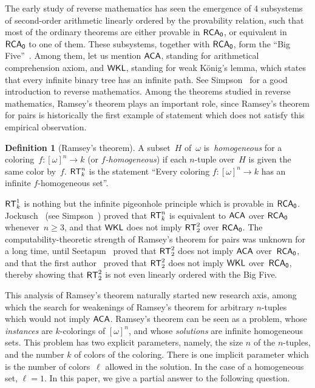 \documentclass{amsart}
\theoremstyle{definition}
\newtheorem{definition}[theorem]{Definition}
\theoremstyle{remark}
\numberwithin{equation}{section}
\theoremstyle{noparens}
\newcommand{\s}[1]{\ensuremath{\sf{#1}}}
\DeclareMathOperator{\rca}{\s{RCA}_0}
\DeclareMathOperator{\aca}{\s{ACA}}
\DeclareMathOperator{\wkl}{\s{WKL}}
\DeclareMathOperator{\rt}{\s{RT}}
\begin{document}
The early study of reverse mathematics has seen the emergence
of 4 subsystems of second-order arithmetic linearly ordered by the provability relation,
such that most of the ordinary theorems are either provable in $\rca$, or equivalent in $\rca$ to one of them.
These subsystems, together with $\rca$, form the ``Big Five''~\cite{Montalban2011Open}.
Among them, let us mention $\aca$, standing for arithmetical comprehension axiom,
and $\wkl$, standing for weak K\"onig's lemma, which states that every infinite binary
tree has an infinite path. See Simpson~\cite{Simpson2009Subsystems}
for a good introduction to reverse mathematics. Among the theorems studied in reverse mathematics,
Ramsey's theorem plays an important role, since Ramsey's theorem for pairs is historically the first example
of statement which does not satisfy this empirical observation.

\begin{definition}[Ramsey's theorem]
A subset~$H$ of~$\omega$ is~\emph{homogeneous} for a coloring~$f : [\omega]^n \to k$ (or \emph{$f$-homogeneous})
if each $n$-tuple over~$H$ is given the same color by~$f$.
$\rt^n_k$ is the statement ``Every coloring $f : [\omega]^n \to k$ has an infinite $f$-homogeneous set''.
\end{definition}

$\rt^1_k$ is nothing but the infinite pigeonhole principle which is provable in $\rca$.
Jockusch~\cite{Jockusch1972Ramseys} (see Simpson~\cite{Simpson2009Subsystems})
proved that $\rt^n_k$ is equivalent to $\aca$ over $\rca$ whenever~$n \geq 3$,
and that $\wkl$ does not imply $\rt^2_2$ over $\rca$.
The computability-theoretic strength of Ramsey's theorem for pairs was unknown for a long time,
until Seetapun~\cite{Seetapun1995strength} proved that $\rt^2_2$ does not imply $\aca$ over~$\rca$,
and that the first author~\cite{Liu2012RT22} proved that $\rt^2_2$ does not imply $\wkl$ over~$\rca$, thereby
showing that $\rt^2_2$ is not even linearly ordered with the Big Five.

This analysis of Ramsey's theorem naturally started new research axis,
among which the search for weakenings of Ramsey's theorem for arbitrary $n$-tuples
which would not imply $\aca$. Ramsey's theorem can be seen as a problem,
whose \emph{instances} are $k$-colorings of $[\omega]^n$, and whose \emph{solutions} are infinite homogeneous sets.
This problem has two explicit parameters, namely, the size $n$ of the $n$-tuples, and the number $k$ of colors of the coloring.
There is one implicit parameter which is the number of colors~$\ell$ allowed in the solution.
In the case of a homogeneous set, $\ell = 1$. In this paper, we give a partial answer to the following question.
\end{document}
